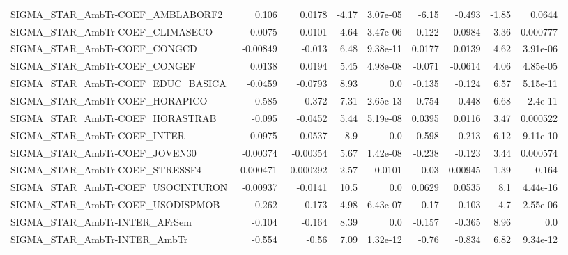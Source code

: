 \begin{tabular}{lrrrrrrrr}
SIGMA\_STAR\_AmbTr-COEF\_AMBLABORF2      &       0.106 &       0.0178 &    -4.17 & 3.07e-05 &      -6.15 &      -0.493 &        -1.85 &        0.0644 \\
SIGMA\_STAR\_AmbTr-COEF\_CLIMASECO       &     -0.0075 &      -0.0101 &     4.64 & 3.47e-06 &     -0.122 &     -0.0984 &         3.36 &      0.000777 \\
SIGMA\_STAR\_AmbTr-COEF\_CONGCD          &    -0.00849 &       -0.013 &     6.48 & 9.38e-11 &     0.0177 &      0.0139 &         4.62 &      3.91e-06 \\
SIGMA\_STAR\_AmbTr-COEF\_CONGEF          &      0.0138 &       0.0194 &     5.45 & 4.98e-08 &     -0.071 &     -0.0614 &         4.06 &      4.85e-05 \\
SIGMA\_STAR\_AmbTr-COEF\_EDUC\_BASICA     &     -0.0459 &      -0.0793 &     8.93 &      0.0 &     -0.135 &      -0.124 &         6.57 &      5.15e-11 \\
SIGMA\_STAR\_AmbTr-COEF\_HORAPICO        &      -0.585 &       -0.372 &     7.31 & 2.65e-13 &     -0.754 &      -0.448 &         6.68 &       2.4e-11 \\
SIGMA\_STAR\_AmbTr-COEF\_HORASTRAB       &      -0.095 &      -0.0452 &     5.44 & 5.19e-08 &     0.0395 &      0.0116 &         3.47 &      0.000522 \\
SIGMA\_STAR\_AmbTr-COEF\_INTER           &      0.0975 &       0.0537 &      8.9 &      0.0 &      0.598 &       0.213 &         6.12 &      9.11e-10 \\
SIGMA\_STAR\_AmbTr-COEF\_JOVEN30         &    -0.00374 &     -0.00354 &     5.67 & 1.42e-08 &     -0.238 &      -0.123 &         3.44 &      0.000574 \\
SIGMA\_STAR\_AmbTr-COEF\_STRESSF4        &   -0.000471 &    -0.000292 &     2.57 &   0.0101 &       0.03 &     0.00945 &         1.39 &         0.164 \\
SIGMA\_STAR\_AmbTr-COEF\_USOCINTURON     &    -0.00937 &      -0.0141 &     10.5 &      0.0 &     0.0629 &      0.0535 &          8.1 &      4.44e-16 \\
SIGMA\_STAR\_AmbTr-COEF\_USODISPMOB      &      -0.262 &       -0.173 &     4.98 & 6.43e-07 &      -0.17 &      -0.103 &          4.7 &      2.55e-06 \\
SIGMA\_STAR\_AmbTr-INTER\_AFrSem         &      -0.104 &       -0.164 &     8.39 &      0.0 &     -0.157 &      -0.365 &         8.96 &           0.0 \\
SIGMA\_STAR\_AmbTr-INTER\_AmbTr          &      -0.554 &        -0.56 &     7.09 & 1.32e-12 &      -0.76 &      -0.834 &         6.82 &      9.34e-12 \\

\end{tabular}
